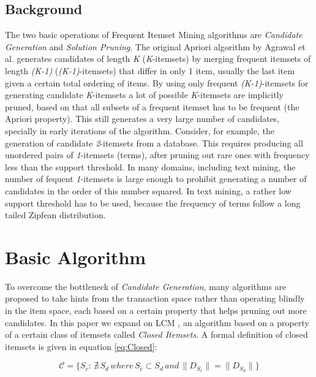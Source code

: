 \documentclass{sig-alternate}
\begin{document}
\subsection{Background}

The two basic operations of Frequent Itemset Mining algorithms are \emph{Candidate Generation} and \emph{Solution Pruning}. The original Apriori algorithm by Agrawal et al. \cite{agrawal1994fast} generates candidates of length \emph{K} (\emph{K}-itemsets) by merging frequent itemsets of length \emph{(K-1)} (\emph{(K-1)}-itemsets) that differ in only 1 item, usually the last item given a certain total ordering of items. By using only frequent  \emph{(K-1)}-itemsets for generating candidate \emph{K}-itemsets a lot of possible \emph{K}-itemsets are implicitly pruned, based on that all subsets of a frequent itemset has to be frequent (the Apriori property). This still generates a very large number of candidates, specially in early iterations of the algorithm. Consider, for example, the generation of candidate \emph{2}-itemsets from a database. This requires producing all unordered pairs of \emph{1}-itemsets (terms), after pruning out rare ones with frequency less than the support threshold. In many domains, including text mining, the number of fequent \emph{1}-itemsets is large enough to prohibit generating a number of candidates in the order of this number squared. In text mining, a rather low support threshold has to be used, because the frequency of terms follow a long tailed Zipfean distribution.

\section{Basic Algorithm}
To overcome the bottleneck of \emph{Candidate Generation}, many algorithms are proposed to take hints from the transaction space rather than operating blindly in the item space, each based on a certain property that helps pruning out more candidates. In this paper we expand on LCM \cite{lcm}, an algorithm based on a property of a certain class of itemsets called \emph{Closed Itemsets}. A formal definition of closed itemsets is given in equation \ref{eq:Closed}: 

\begin{equation}\label{eq:Closed}\mathcal{C} = \{S_c:\, \nexists \, S_d \, where \, S_c  \subset S_d \, and \, \|D_{S_c}\| = \|D_{S_d}\|\}\end{equation}
\end{document}
